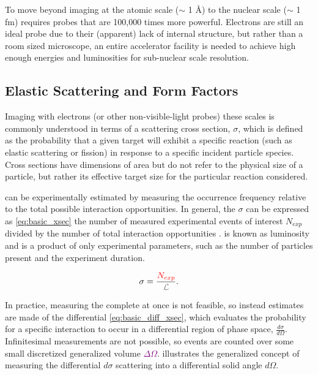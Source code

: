         To move beyond imaging at the atomic scale ($\sim$ 1 \AA) to the nuclear scale ($\sim$ 1 fm) requires probes that are 100,000 times more powerful. Electrons are still an ideal probe due to their (apparent) lack of internal structure, but rather than a room sized microscope, an entire accelerator facility is needed to achieve high enough energies and luminosities for sub-nuclear scale resolution. 
        


    \subsection{Elastic Scattering and Form Factors}
        Imaging with electrons (or other non-visible-light probes) these scales is commonly understood in terms of a scattering cross section, $\sigma$, which is defined as the probability that a given target will exhibit a specific reaction (such as elastic scattering or fission) in response to a specific incident particle species. Cross sections have dimensions of area but do not refer to the physical size of a particle, but rather its effective target size for the particular reaction considered. 

        \Xsecs can be experimentally estimated by measuring the occurrence frequency relative to the total possible interaction opportunities. In general, the \xsec $\sigma$ can be expressed as \eqref{eq:basic_xsec} the number of measured experimental events of interest $N_{exp}$ divided by the number of total interaction opportunities \Lumi. \Lumispace is known as luminosity and is a product of only experimental parameters, such as the number of particles present and the experiment duration. 

        \begin{equation} \label{eq:basic_xsec}
            \sigma = \frac{\counts}{\Lumi}.
        \end{equation}

        In practice, measuring the complete \xsec at once is not feasible, so instead estimates are made of the differential \xsec \eqref{eq:basic_diff_xsec}, which evaluates the probability for a specific interaction to occur in a differential region of phase space, $\frac{d\sigma}{d\Omega}$. Infinitesimal measurements are not possible, so events are counted over some small discretized generalized volume \textcolor{purple}{$\Delta \Omega$}.  illustrates the generalized concept of measuring the differential \xsec $d\sigma$ scattering into a differential solid angle $d\Omega$.
        
